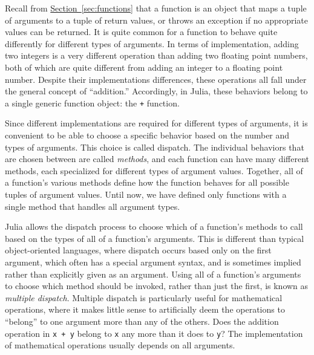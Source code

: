 \documentclass{article}
\newcommand{\Section}[1]{\hyperref[sec:#1]{Section~\ref*{sec:#1}}}
\begin{document}
Recall from \Section{functions} that a function is an object that maps a tuple of arguments to a tuple of return values, or throws an exception if no appropriate values can be returned.
It is quite common for a function to behave quite differently for different types of arguments.
In terms of implementation, adding two integers is a very different operation than adding two floating point numbers, both of which are quite different from adding an integer to a floating point number.
Despite their implementations differences, these operations all fall under the general concept of ``addition.''
Accordingly, in Julia, these behaviors belong to a single generic function object: the \verb|+| function.

Since different implementations are required for different types of arguments, it is convenient to be able to choose a specific behavior based on the number and types of arguments.
This choice is called dispatch.
The individual behaviors that are chosen between are called \emph{methods}, and each function can have many different methods, each specialized for different types of argument values.
Together, all of a function's various methods define how the function behaves for all possible tuples of argument values.
Until now, we have defined only functions with a single method that handles all argument types.

Julia allows the dispatch process to choose which of a function's methods to call based on the types of all of a function's arguments.
This is different than typical object-oriented languages, where dispatch occurs based only on the first argument, which often has a special argument syntax, and is sometimes implied rather than explicitly given as an argument.
Using all of a function's arguments to choose which method should be invoked, rather than just the first, is known as \emph{multiple dispatch}.
Multiple dispatch is particularly useful for mathematical operations, where it makes little sense to artificially deem the operations to ``belong'' to one argument more than any of the others.
Does the addition operation in \verb|x + y| belong to \verb|x| any more than it does to \verb|y|?
The implementation of mathematical operations usually depends on all arguments.
\end{document}
